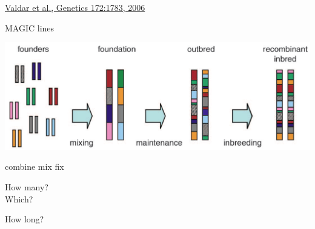 \documentclass[12pt]{article}
\newcommand{\citesize}{\fontsize{14}{18} \selectfont}
\newcommand{\headsize}{\fontsize{35}{35} \selectfont}
\newcommand{\smallsize}{\fontsize{25}{30} \selectfont}
\newcommand{\smallersize}{\fontsize{20}{25} \selectfont}
\begin{document}
{\vfill

\hfill {\citesize \color{citecolor} \href{http://www.genetics.org/content/172/3/1783.full}{Valdar et al., Genetics 172:1783, 2006}}

\vspace*{5mm}


\newpage

\addtocounter{page}{-1}

\headsize \color{myyellow}
\hfill \begin{minipage}{5.75in}
\centering
MAGIC lines
\end{minipage}

\vspace{20mm}

\centerline{\includegraphics[width=10in]{Figs/valdar_genet2006.png}}

\smallsize \color{myyellow}
\hspace*{52mm} combine \hspace*{35mm} mix \hspace*{52mm} fix

\smallersize
\color{mywhite}
\vspace{20pt}

\hspace*{6mm}
\begin{minipage}[t]{45mm}
\vspace*{0mm}
\centering

How many? \\[20pt]
Which?
\end{minipage}
\hspace{57mm}
\begin{minipage}[t]{45mm}
\vspace*{0mm}
\centering

How long?
\end{minipage}
\hspace{18mm}
\begin{minipage}[t]{45mm}
\vspace*{0mm}
\centering


\end{minipage}


}
\end{document}
